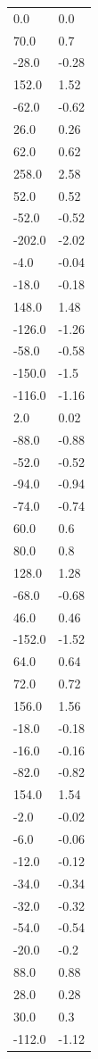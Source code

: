 \begin{longtable}{ll}
0.0 & 0.0 \\
70.0 & 0.7 \\
-28.0 & -0.28 \\
152.0 & 1.52 \\
-62.0 & -0.62 \\
26.0 & 0.26 \\
62.0 & 0.62 \\
258.0 & 2.58 \\
52.0 & 0.52 \\
-52.0 & -0.52 \\
-202.0 & -2.02 \\
-4.0 & -0.04 \\
-18.0 & -0.18 \\
148.0 & 1.48 \\
-126.0 & -1.26 \\
-58.0 & -0.58 \\
-150.0 & -1.5 \\
-116.0 & -1.16 \\
2.0 & 0.02 \\
-88.0 & -0.88 \\
-52.0 & -0.52 \\
-94.0 & -0.94 \\
-74.0 & -0.74 \\
60.0 & 0.6 \\
80.0 & 0.8 \\
128.0 & 1.28 \\
-68.0 & -0.68 \\
46.0 & 0.46 \\
-152.0 & -1.52 \\
64.0 & 0.64 \\
72.0 & 0.72 \\
156.0 & 1.56 \\
-18.0 & -0.18 \\
-16.0 & -0.16 \\
-82.0 & -0.82 \\
154.0 & 1.54 \\
-2.0 & -0.02 \\
-6.0 & -0.06 \\
-12.0 & -0.12 \\
-34.0 & -0.34 \\
-32.0 & -0.32 \\
-54.0 & -0.54 \\
-20.0 & -0.2 \\
88.0 & 0.88 \\
28.0 & 0.28 \\
30.0 & 0.3 \\
-112.0 & -1.12 \\

\end{longtable}
